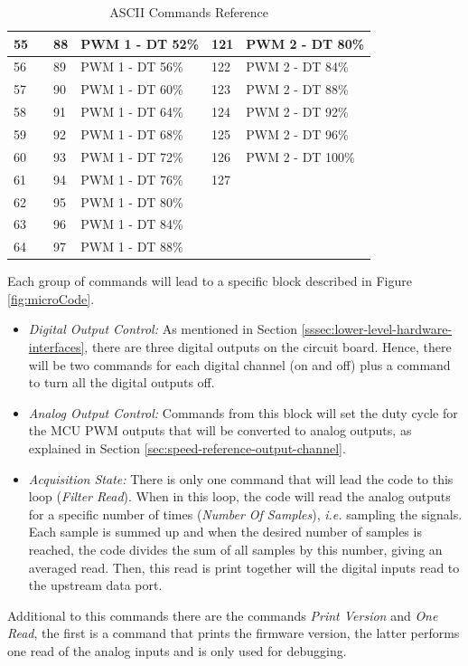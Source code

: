 \begin{table}[h!]
\begin{tabular}{|l|l|l|l|l|l|}
		55 &  & 88 & PWM 1 - DT 52\% & 121 & PWM 2 - DT 80\% \\ \hline
		56 &  & 89 & PWM 1 - DT 56\% & 122 & PWM 2 - DT 84\% \\ \hline
		57 &  & 90 & PWM 1 - DT 60\% & 123 & PWM 2 - DT 88\% \\ \hline
		58 &  & 91 & PWM 1 - DT 64\% & 124 & PWM 2 - DT 92\% \\ \hline
		59 &  & 92 & PWM 1 - DT 68\% & 125 & PWM 2 - DT 96\% \\ \hline
		60 &  & 93 & PWM 1 - DT 72\% & 126 & PWM 2 - DT 100\% \\ \hline
		61 &  & 94 & PWM 1 - DT 76\% & 127 &  \\ \hline
		62 &  & 95 & PWM 1 - DT 80\% &  &  \\ \hline
		63 &  & 96 & PWM 1 - DT 84\% &  &  \\ \hline
		64 &  & 97 & PWM 1 - DT 88\% &  &  \\ \hline
		\end{tabular}
		\caption{ASCII Commands Reference}
		\label{table:ascii-commands}
	\end{table}


	Each group of commands will lead to a specific block described in Figure \ref{fig:microCode}.

	\begin{itemize}
		\item \textit{Digital Output Control:} As mentioned in Section \ref{sssec:lower-level-hardware-interfaces}, there are three digital outputs on the circuit board. Hence, there will be two commands for each digital channel (on and off) plus a command to turn all the digital outputs off. 
		\item \textit{Analog Output Control:} Commands from this block will set the duty cycle for the MCU PWM outputs that will be converted to analog outputs, as explained in Section \ref{sec:speed-reference-output-channel}.
		\item \textit{Acquisition State: } There is only one command that will lead the code to this loop (\textit{Filter Read}). When in this loop, the code will read the analog outputs for a specific number of times (\textit{Number Of Samples}), \textit{i.e.} sampling the signals. Each sample is summed up and when the desired number of samples is reached, the code divides the sum of all samples by this number, giving an averaged read. Then, this read is print together will the digital inputs read to the upstream data port.
	\end{itemize}

	Additional to this commands there are the commands \textit{Print Version} and \textit{One Read}, the first is a command that prints the firmware version, the latter performs one read of the analog inputs and is only used for debugging.